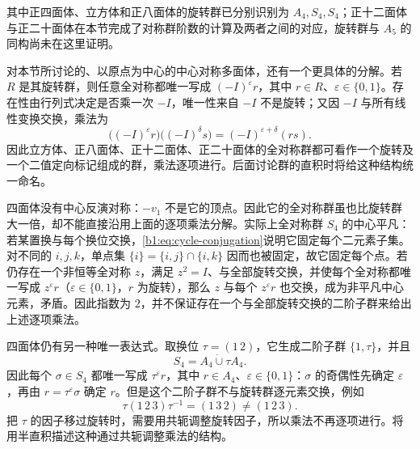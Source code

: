 其中正四面体、立方体和正八面体的旋转群已分别识别为 \(A_4,S_4,S_4\)；正十二面体与正二十面体在本节完成了对称群阶数的计算及两者之间的对应，旋转群与 \(A_5\) 的同构尚未在这里证明。

\ProseParagraphBreak
对本节所讨论的、以原点为中心的中心对称多面体，还有一个更具体的分解。若 \(R\) 是其旋转群，则任意全对称都唯一写成 \((-I)^\varepsilon r\)，其中 \(r\in R\)、\(\varepsilon\in\{0,1\}\)。存在性由行列式决定是否乘一次 \(-I\)，唯一性来自 \(-I\) 不是旋转；又因 \(-I\) 与所有线性变换交换，乘法为
\[
	\bigl((-I)^\varepsilon r\bigr)\bigl((-I)^\delta s\bigr) =(-I)^{\varepsilon+\delta}(rs).
\]
因此立方体、正八面体、正十二面体、正二十面体的全对称群都可看作一个旋转及一个二值定向标记组成的群，乘法逐项进行。后面讨论群的直积时将给这种结构统一命名。

\ProseParagraphBreak
四面体没有中心反演对称：\(-v_1\) 不是它的顶点。因此它的全对称群虽也比旋转群大一倍，却不能直接沿用上面的逐项乘法分解。实际上全对称群 \(S_4\) 的中心平凡：若某置换与每个换位交换，\eqref{b1:eq:cycle-conjugation}说明它固定每个二元素子集。对不同的 \(i,j,k\)，单点集 \(\{i\}=\{i,j\}\cap\{i,k\}\) 因而也被固定，故它固定每个点。若仍存在一个非恒等全对称 \(z\)，满足 \(z^2=I\)、与全部旋转交换，并使每个全对称都唯一写成 \(z^\varepsilon r\)（\(\varepsilon\in\{0,1\}\)，\(r\) 为旋转），那么 \(z\) 与每个 \(z^\varepsilon r\) 也交换，成为非平凡中心元素，矛盾。因此指数为 \(2\)，并不保证存在一个与全部旋转交换的二阶子群来给出上述逐项乘法。

\ProseParagraphBreak
四面体仍有另一种唯一表达式。取换位 \(\tau=(1\,2)\)，它生成二阶子群 \(\{1,\tau\}\)，并且
\[
	S_4=A_4\mathbin{\dot\cup}\tau A_4.
\]
因此每个 \(\sigma\in S_4\) 都唯一写成 \(\tau^\varepsilon r\)，其中 \(r\in A_4\)、\(\varepsilon\in\{0,1\}\)：\(\sigma\) 的奇偶性先确定 \(\varepsilon\)，再由 \(r=\tau^\varepsilon\sigma\) 确定 \(r\)。但是这个二阶子群不与旋转群逐元素交换，例如
\[
	\tau(1\,2\,3)\tau^{-1}=(1\,3\,2)\ne(1\,2\,3).
\]
把 \(\tau\) 的因子移过旋转时，需要用共轭调整旋转因子，所以乘法不再逐项进行。将用半直积描述这种通过共轭调整乘法的结构。
